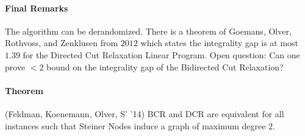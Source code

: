 \documentclass[letterpaper,12pt,oneside,onecolumn]{article}
\begin{document}
\paragraph{Final Remarks}
The algorithm can be derandomized. There is a theorem of Goemans, Olver, Rothvoss, and Zenklusen from $2012$ which states the integrality gap is at most $1.39$ for the Directed Cut Relaxation Linear Program. Open question: Can one prove $<2$ bound on the integrality gap of the Bidirected Cut Relaxation?
\paragraph{Theorem}
(Feldman, Koenemann, Olver, S' '14) BCR and DCR are equivalent for all instances such that Steiner Nodes induce a graph of maximum degree $2$.
\end{document}
